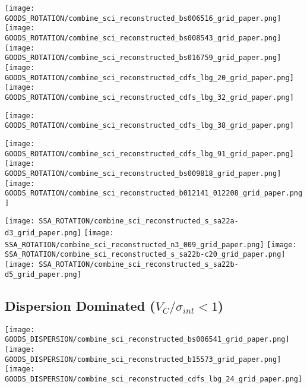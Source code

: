 \documentclass[fleqn,usenatbib]{mn2e}
\begin{document}
\begin{figure*}
\centering
\texttt{[image: GOODS\_ROTATION/combine\_sci\_reconstructed\_bs006516\_grid\_paper.png]}
\texttt{[image: GOODS\_ROTATION/combine\_sci\_reconstructed\_bs008543\_grid\_paper.png]}
\texttt{[image: GOODS\_ROTATION/combine\_sci\_reconstructed\_bs016759\_grid\_paper.png]}
\texttt{[image: GOODS\_ROTATION/combine\_sci\_reconstructed\_cdfs\_lbg\_20\_grid\_paper.png]}
\texttt{[image: GOODS\_ROTATION/combine\_sci\_reconstructed\_cdfs\_lbg\_32\_grid\_paper.png]}
\label{fig:goods_rot_1}
\end{figure*}

\begin{figure*}
\centering
\texttt{[image: GOODS\_ROTATION/combine\_sci\_reconstructed\_cdfs\_lbg\_38\_grid\_paper.png]}
\label{fig:goods_rot_2}
\end{figure*}


\begin{figure*}
\centering
\texttt{[image: GOODS\_ROTATION/combine\_sci\_reconstructed\_cdfs\_lbg\_91\_grid\_paper.png]}
\texttt{[image: GOODS\_ROTATION/combine\_sci\_reconstructed\_bs009818\_grid\_paper.png]}
\texttt{[image: GOODS\_ROTATION/combine\_sci\_reconstructed\_b012141\_012208\_grid\_paper.png]}
\label{fig:goods_rot_3}
\end{figure*}

\begin{figure*}
\centering
\texttt{[image: SSA\_ROTATION/combine\_sci\_reconstructed\_s\_sa22a-d3\_grid\_paper.png]}
\texttt{[image: SSA\_ROTATION/combine\_sci\_reconstructed\_n3\_009\_grid\_paper.png]}
\texttt{[image: SSA\_ROTATION/combine\_sci\_reconstructed\_s\_sa22b-c20\_grid\_paper.png]}
\texttt{[image: SSA\_ROTATION/combine\_sci\_reconstructed\_s\_sa22b-d5\_grid\_paper.png]}
\label{fig:SSA_rot_1}
\end{figure*}

\subsection{Dispersion Dominated ($V_{C}/\sigma_{int} < 1$)}\label{app:dispersion_dominated}

\begin{figure*}
\centering
\texttt{[image: GOODS\_DISPERSION/combine\_sci\_reconstructed\_bs006541\_grid\_paper.png]}
\texttt{[image: GOODS\_DISPERSION/combine\_sci\_reconstructed\_b15573\_grid\_paper.png]}
\texttt{[image: GOODS\_DISPERSION/combine\_sci\_reconstructed\_cdfs\_lbg\_24\_grid\_paper.png]}
\label{fig:goods_disp_1}
\end{figure*}
\end{document}
